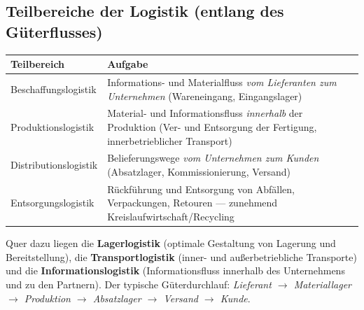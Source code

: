 \documentclass[11pt, a4paper]{article}
\begin{document}
\subsection{Teilbereiche der Logistik (entlang des Güterflusses)}

\begin{center}
\begin{tabular}{p{4.2cm} p{10cm}}
\textbf{Teilbereich} & \textbf{Aufgabe}\\
\hline
Beschaffungslogistik & Informations- und Materialfluss \emph{vom Lieferanten zum Unternehmen} (Wareneingang, Eingangslager)\\
Produktionslogistik & Material- und Informationsfluss \emph{innerhalb} der Produktion (Ver- und Entsorgung der Fertigung, innerbetrieblicher Transport)\\
Distributionslogistik & Belieferungswege \emph{vom Unternehmen zum Kunden} (Absatzlager, Kommissionierung, Versand)\\
Entsorgungslogistik & Rückführung und Entsorgung von Abfällen, Verpackungen, Retouren --- zunehmend Kreislaufwirtschaft/Recycling\\
\end{tabular}
\end{center}

Quer dazu liegen die \textbf{Lagerlogistik} (optimale Gestaltung von Lagerung und
Bereitstellung), die \textbf{Transportlogistik} (inner- und außerbetriebliche
Transporte) und die \textbf{Informationslogistik} (Informationsfluss innerhalb des
Unternehmens und zu den Partnern). Der typische Güterdurchlauf: \emph{Lieferant
$\rightarrow$ Materiallager $\rightarrow$ Produktion $\rightarrow$ Absatzlager
$\rightarrow$ Versand $\rightarrow$ Kunde}.
\end{document}

